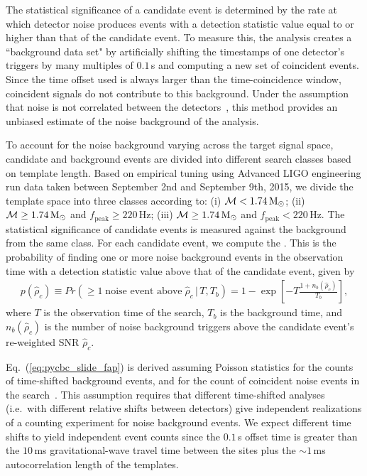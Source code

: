 The statistical significance of a candidate event is determined by the rate at which
detector noise produces events with a detection statistic value equal to or
higher than that of the candidate event. To measure this, the analysis creates
a ``background data set" by artificially shifting the time\-stamps of one
detector's triggers by many multiples of $0.1$\,s and computing a new set of
coincident events.  Since the time offset used is always larger than the
time-coincidence window, coincident signals do not contribute to this
background. Under the assumption that noise is not correlated between the
detectors~\cite{GW150914-DETCHAR}, this method provides an unbiased estimate
of the noise background of the analysis. 

To account for the noise background varying across the target signal space,
candidate and background events are divided into different search classes
based on template length.  Based on empirical tuning using Advanced LIGO
engineering run data taken between September 2nd and September 9th, 2015, we
divide the template space into three classes according to: (i) $\mathcal{M} <
1.74\,\mathrm{M}_\odot$; (ii) $\mathcal{M}
\geq 1.74\,\mathrm{M}_\odot$ and $f_\mathrm{peak} \geq 220\,$Hz; (iii) $\mathcal{M} \geq 1.74\,\mathrm{M}_\odot$
and $f_\mathrm{peak} < 220\,$Hz.  The statistical significance of candidate events is
measured against the background from the same class.  For each candidate
event, we compute the \fap{}. This is the probability
of finding one or more noise background events in the observation time with a
detection statistic value above that of the candidate event, given
by~\cite{Usman:2015kfa, Capano:2016uif}
\begin{equation} 
\begin{split}
\label{eq:pycbc_slide_fap}
 p(\hat{\rho}_c) \equiv Pr(\geq 1\;\text{noise event above}\;\hat{\rho}_c \, | \, T, T_b) = 
 1 - \exp\left[ -T \frac{1+n_b(\hat{\rho}_c)}{T_b} \right],
\end{split}
\end{equation}
where $T$ is the observation time of the search, $T_b$ is the background time,
and $n_b(\hat{\rho}_c)$ is the number of noise background triggers above the
candidate event's re-weighted SNR $\hat{\rho}_c$. 

Eq.~(\ref{eq:pycbc_slide_fap}) is derived assuming Poisson statistics for the
counts of time-shifted background events, and for the count of coincident
noise events in the search~\cite{Usman:2015kfa, Capano:2016uif}.  This
assumption requires that different time-shifted analyses (i.e.\ with different
relative shifts between detectors) give independent realizations of a counting
experiment for noise background events. We expect different time shifts to
yield independent event counts since the $0.1$\,s offset time is greater than
the $10$\,ms gravitational-wave travel time between the sites plus the $\sim
1$\,ms autocorrelation length of the templates.

